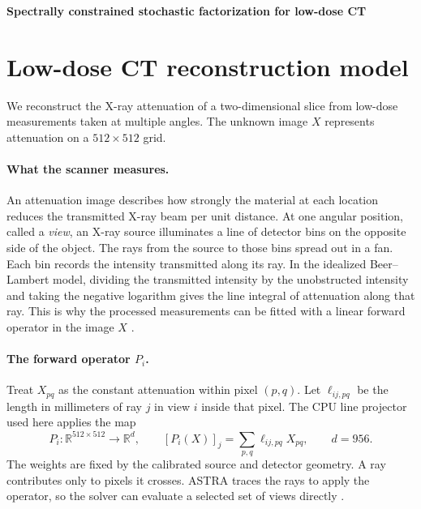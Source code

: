 \documentclass[11pt]{article}
\begin{document}
\begin{center}
  \Large\bfseries Spectrally constrained stochastic factorization for low-dose CT
\end{center}

\section{Low-dose CT reconstruction model}
\label{sec:ct-model}

We reconstruct the X-ray attenuation of a two-dimensional slice from low-dose measurements taken at multiple angles. The unknown image \(X\) represents attenuation on a \(512\times512\) grid.

\paragraph{What the scanner measures.}
An attenuation image describes how strongly the material at each location reduces the transmitted X-ray beam per unit distance. At one angular position, called a \emph{view}, an X-ray source illuminates a line of detector bins on the opposite side of the object. The rays from the source to those bins spread out in a fan. Each bin records the intensity transmitted along its ray. In the idealized Beer--Lambert model, dividing the transmitted intensity by the unobstructed intensity and taking the negative logarithm gives the line integral of attenuation along that ray. This is why the processed measurements can be fitted with a linear forward operator in the image \(X\) \cite{detect}.

\paragraph{The forward operator \(P_i\).}
Treat \(X_{pq}\) as the constant attenuation within pixel \((p,q)\). Let \(\ell_{ij,pq}\) be the length in millimeters of ray \(j\) in view \(i\) inside that pixel. The CPU line projector used here applies the map
\begin{equation}
  P_i\colon\mathbb R^{512\times512}\longrightarrow\mathbb R^{d},
  \qquad
  [P_i(X)]_j=\sum_{p,q}\ell_{ij,pq}X_{pq},
  \qquad d=956 .
  \label{eq:ct-ray}
\end{equation}
The weights are fixed by the calibrated source and detector geometry. A ray contributes only to pixels it crosses. ASTRA traces the rays to apply the operator, so the solver can evaluate a selected set of views directly \cite{astra}.
\end{document}
